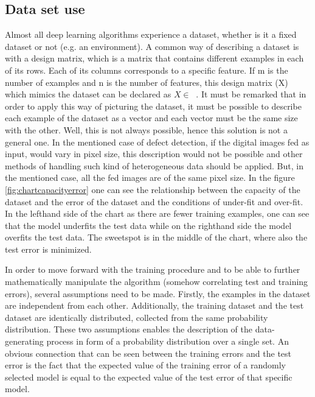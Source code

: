 \documentclass[12pt,a4paper,twoside]{report}
\DeclareMathOperator{\Rr}{\mathbb{R}^{mxn}}
\begin{document}
\subsection{Data set use}

Almost all deep learning algorithms experience a dataset, whether is it a fixed dataset or not (e.g. an environment). A common way of describing a dataset is with a design matrix, which is a matrix that contains different examples in each of its rows. Each of its columns corresponds to a specific feature. If m is the number of examples and n is the number of features, this design matrix (X) which mimics the dataset can be declared as $X \in \Rr$. It must be remarked that in order to apply this way of picturing the dataset, it must be possible to describe each example of the dataset as a vector and each vector must be the same size with the other. Well, this is not always possible, hence this solution is not a general one. In the mentioned case of defect detection, if the digital images fed as input, would vary in pixel size, this description would not be possible and other methods of handling such kind of heterogeneous data should be applied. But, in the mentioned case, all the fed images are of the same pixel size. In the figure \ref{fig:chartcapacityerror} one can see the relationship between the capacity of the dataset and the error of the dataset and the conditions of under-fit and over-fit. In the lefthand side of the chart as there are fewer training examples, one can see that the model underfits the test data while on the righthand side the model overfits the test data. The sweetspot is in the middle of the chart, where also the test error is minimized.

In order to move forward with the training procedure and to be able to further mathematically manipulate the algorithm (somehow correlating test and training errors), several assumptions need to be made. Firstly, the examples in the dataset are independent from each other. Additionally, the training dataset and the test dataset are identically distributed, collected from the same probability distribution. These two assumptions enables the description of the data-generating process in form of a probability distribution over a single set. An obvious connection that can be seen between the training errors and the test error is the fact that the expected value of the training error of a randomly selected model is equal to the expected value of the test error of that specific model.
\end{document}
